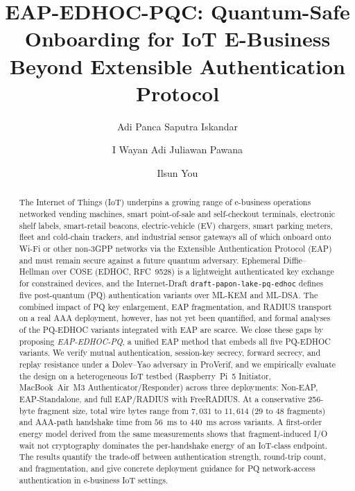 \documentclass{easychair}
\title{EAP-EDHOC-PQC: Quantum-Safe Onboarding for IoT E-Business Beyond Extensible Authentication Protocol}
\author{
Adi Panca Saputra Iskandar\inst{1,2}
\and
I Wayan Adi Juliawan Pawana\inst{1,2}
\and
Ilsun You\inst{2}
}
\institute{
Kookmin University, Seoul, Korea\\
\email{adipancaiskandar@gmail.com, adijuliawanpawana@unud.ac.id, ilsunu@gmail.com}
\and
Udayana University, Bali, Indonesia\\
}
\begin{document}
\maketitle

\begin{abstract}
The Internet of Things (IoT) underpins a growing range of e-business
operations networked vending machines, smart point-of-sale and
self-checkout terminals, electronic shelf labels, smart-retail
beacons, electric-vehicle (EV) chargers, smart parking meters, fleet
and cold-chain trackers, and industrial sensor gateways all of
which onboard onto Wi-Fi or other non-3GPP networks via the
Extensible Authentication Protocol (EAP) and must remain secure
against a future quantum adversary. Ephemeral Diffie--Hellman over
COSE (EDHOC, RFC~9528) is a lightweight authenticated key exchange
for constrained devices, and the Internet-Draft
\texttt{draft-papon-lake-pq-edhoc} defines five post-quantum (PQ)
authentication variants over ML-KEM and ML-DSA. The combined impact
of PQ key enlargement, EAP fragmentation, and RADIUS transport on a
real AAA deployment, however, has not yet been quantified, and
formal analyses of the PQ-EDHOC variants integrated with EAP are
scarce. We close these gaps by proposing \emph{EAP-EDHOC-PQ}, a
unified EAP method that embeds all five PQ-EDHOC variants. We verify
mutual authentication, session-key secrecy, forward secrecy, and
replay resistance under a Dolev--Yao adversary in ProVerif, and we
empirically evaluate the design on a heterogeneous IoT testbed
(Raspberry~Pi~5 Initiator, MacBook~Air~M3 Authenticator/Responder)
across three deployments: Non-EAP, EAP-Standalone, and full
EAP/RADIUS with FreeRADIUS. At a conservative 256-byte fragment
size, total wire bytes range from $7{,}031$ to $11{,}614$ ($29$ to
$48$ fragments) and AAA-path handshake time from $56$~ms to $440$~ms
across variants. A first-order energy model derived from the same
measurements shows that fragment-induced I/O wait not
cryptography dominates the per-handshake energy of an IoT-class
endpoint. The results quantify the trade-off between authentication
strength, round-trip count, and fragmentation, and give concrete
deployment guidance for PQ network-access authentication in
e-business IoT settings.

\end{abstract}


\end{document}
